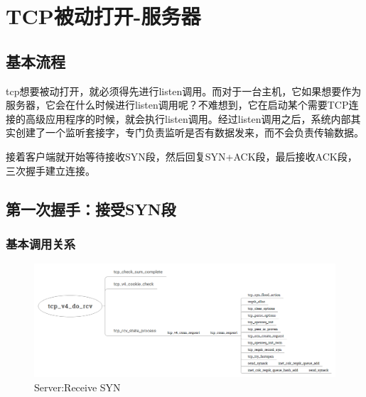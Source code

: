\section{TCP被动打开-服务器}
\label{sec:tcp_server_connect}
        \subsection{基本流程}
            tcp想要被动打开，就必须得先进行listen调用。而对于一台主机，它如果想要作为服务器，它会在什么时候进行listen调用呢？不难想到，它在启动某个需要TCP连接的高级应用程序的时候，就会执行listen调用。经过listen调用之后，系统内部其实创建了一个监听套接字，专门负责监听是否有数据发来，而不会负责传输数据。

            接着客户端就开始等待接收SYN段，然后回复SYN+ACK段，最后接收ACK段，三次握手建立连接。 
        \subsection{第一次握手：接受SYN段}
            \subsubsection{基本调用关系}
                \begin{figure}[htb]        
                    \centering
                    \includegraphics[width=\textwidth]{images/Server:Receive_SYN.png}
                    \caption{Server:Receive SYN}
                    \label{Server:Receive SYN}
                \end{figure}       
